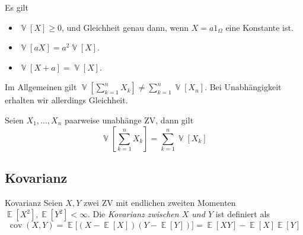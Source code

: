 \documentclass[a4paper,10pt]{article}
\DeclareMathOperator{\E}{\mathbb{E}}
\DeclareMathOperator{\V}{\mathbb{V}}
\DeclareMathOperator{\cov}{cov}
\DeclareMathOperator{\Ber}{Ber}
\DeclareMathOperator{\Bin}{Bin}
\DeclareMathOperator{\Poisson}{Poisson}
\DeclareMathOperator{\uniform}{\mathcal{U}}
\DeclareMathOperator{\normal}{\mathcal{N}}
\numberwithin{equation}{section}
\begin{document}
Es gilt
\begin{itemize}
    \item \( \V[X] \geq 0 \), und Gleichheit genau dann, wenn \( X = a 1_\Omega \) eine Konstante ist.
    \item \( \V[aX] = a^2 \V[X] \).
    \item \( \V[X + a] = \V[X] \).
\end{itemize}

\begin{subbox}{}
    Im Allgemeinen gilt \( \V\left[ \sum_{k = 1}^n X_k \right] \neq \sum_{k = 1}^n \V[X_n] \). Bei Unabhängigkeit erhalten wir allerdings Gleichheit.

    Seien \( X_1, \dots, X_n \) paarweise unabhänge ZV, dann gilt
    \[
        \V\left[ \sum_{k = 1}^n X_k \right] = \sum_{k = 1}^n \V[X_k]
    \]
\end{subbox}






\subsection{Kovarianz}

\begin{mainbox}{Kovarianz}
    Seien \( X, Y \) zwei ZV mit endlichen zweiten Momenten \( \E[X^2], \E[Y^2] < \infty \). Die \emph{Kovarianz zwischen \( X \) und \( Y \)} ist definiert als
    \[
        \cov(X, Y) = \E\big[(X - \E[X])(Y - \E[Y])\big] = \E[XY] - \E[X]\E[Y]
    \]
\end{mainbox}
\end{document}
